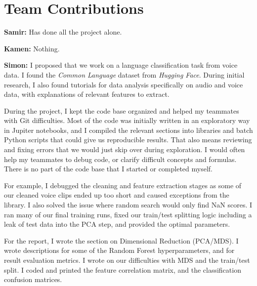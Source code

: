 \documentclass[twocolumn]{article}
\begin{document}
\section{Team Contributions}
\begin{flushend}
\textbf{Samir:} Has done all the project alone.

\textbf{Kamen:} Nothing.

\textbf{Simon:}
I proposed that we work on a language classification task from voice data. I found the \textit{Common Language} dataset from \textit{Hugging Face}. During initial research, I also found tutorials for data analysis specifically on audio and voice data, with explanations of relevant features to extract.

During the project, I kept the code base organized and helped my teammates with Git difficulties. Most of the code was initially written in an exploratory way in Jupiter notebooks, and I compiled the relevant sections into libraries and batch Python scripts that could give us reproducible results. That also means reviewing and fixing errors that we would just skip over during exploration. I would often help my teammates to debug code, or clarify difficult concepts and formulas. There is no part of the code base that I started or completed myself.

For example, I debugged the cleaning and feature extraction stages as some of our cleaned voice clips ended up too short and caused exceptions from the library. I also solved the issue where random search would only find NaN scores. I ran many of our final training runs, fixed our train/test splitting logic including a leak of test data into the PCA step, and provided the optimal parameters.

For the report, I wrote the section on Dimensional Reduction (PCA/MDS). I wrote descriptions for some of the Random Forest hyperparameters, and for result evaluation metrics. I wrote on our difficulties with MDS and the train/test split. I coded and printed the feature correlation matrix, and the classification confusion matrices.
\end{flushend}

\newpage
\end{document}
